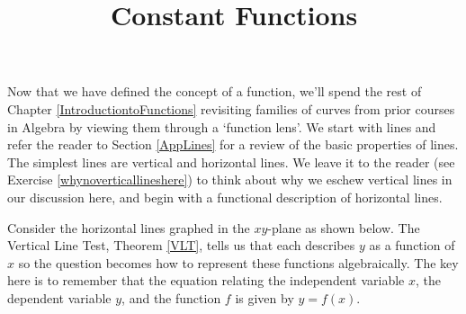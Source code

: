 \documentclass{ximera}
\title{Constant Functions} \license{CC BY-NC-SA 4.0}
\begin{document}
\begin{abstract}
\end{abstract}
\maketitle



Now that we have defined the concept of a function, we'll spend the rest of Chapter \ref{IntroductiontoFunctions} revisiting families of curves from prior courses in Algebra by viewing them through a `function lens'.  We start with lines and refer the reader to Section \ref{AppLines} for a review of the basic properties of lines.  The simplest lines are vertical and horizontal lines.  We leave it to the reader (see Exercise \ref{whynoverticallineshere}) to think about why we eschew vertical lines in our discussion here, and begin with a functional description of horizontal lines.  



Consider the horizontal lines graphed in the $xy$-plane as shown below. The Vertical Line Test, Theorem \ref{VLT}, tells us that each describes $y$ as a function of $x$ so the question becomes how to represent these functions algebraically. The key here is to remember that the equation relating the independent variable $x$,  the dependent variable  $y$, and the function $f$ is given by $y = f(x)$.
\end{document}
